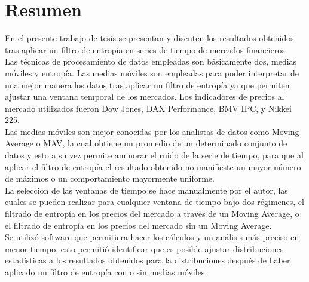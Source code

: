 %

\chapter*{Resumen}
\label{sec:abstract}
\vspace*{-10mm}

En el presente trabajo de tesis se presentan y discuten los resultados obtenidos tras aplicar un filtro de entropía en series de tiempo de mercados financieros.\\
 
Las técnicas de procesamiento de datos empleadas son básicamente dos, medias móviles y entropía. Las medias móviles son empleadas para poder interpretar de una mejor manera los datos tras aplicar un filtro de entropía ya que permiten ajustar una ventana temporal de los mercados. Los indicadores de precios al mercado utilizados fueron Dow Jones, DAX Performance, BMV IPC, y Nikkei 225.\\

Las medias móviles son mejor conocidas por los analistas de datos como Moving Average o MAV, la cual obtiene un promedio de un determinado conjunto de datos y esto a su vez permite aminorar el ruido de la serie de tiempo, para que al aplicar el filtro de entropía el resultado obtenido no manifieste un mayor número de máximos o un comportamiento mayormente uniforme.\\

La selección de las ventanas de tiempo se hace manualmente por el autor, las cuales se pueden realizar para cualquier ventana de tiempo bajo dos régimenes, el filtrado de entropía en los precios del mercado a través de un Moving Average, o el filtrado de entropía en los precios del mercado sin un Moving Average.\\

Se utilizó software que permitiera hacer los cálculos y un análisis más preciso en menor tiempo, esto permitió identificar que es posible ajustar distribuciones estadísticas a los resultados obtenidos para la distribuciones después de haber aplicado un filtro de entropía con o sin medias móviles. %